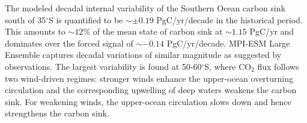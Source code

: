 The modeled decadal internal variability of the Southern Ocean carbon sink south of 35$^\circ$S is quantified to be $\sim\pm0.19$ PgC/yr/decade in the historical period. This amounts to $\sim12\%$ of the mean state of carbon sink at $\sim1.15$ PgC/yr and dominates over the forced signal of $\sim-0.14$ PgC/yr/decade. MPI-ESM Large Ensemble captures decadal variations of similar magnitude as suggested by observations. The largest variability is found at 50-60$^\circ$S, where CO$_2$ flux follows two wind-driven regimes: stronger winds enhance the upper-ocean overturning circulation and the corresponding upwelling of deep waters weakens the carbon sink. For weakening winds, the upper-ocean circulation slows down and hence strengthens the carbon sink.



\clearpage

